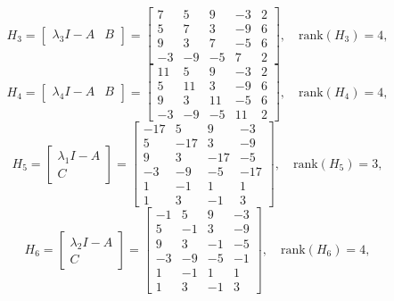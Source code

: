 \begin{equation*}
H_3 = \begin{bmatrix}
    \lambda_3 I - A & B
    \end{bmatrix} =
\begin{bmatrix}
7 & 5 & 9 & -3 & 2 \\
5 & 7 & 3 & -9 & 6 \\
9 & 3 & 7 & -5 & 6 \\
-3 & -9 & -5 & 7 & 2
\end{bmatrix},\quad
\text{rank}(H_3) = 4,
\end{equation*}
\begin{equation*}
H_4 = \begin{bmatrix}
    \lambda_4 I - A & B
    \end{bmatrix} =
\begin{bmatrix}
11 & 5 & 9 & -3 & 2 \\
5 & 11 & 3 & -9 & 6 \\
9 & 3 & 11 & -5 & 6 \\
-3 & -9 & -5 & 11 & 2
\end{bmatrix},\quad
\text{rank}(H_4) = 4,
\end{equation*}
\begin{equation*}
H_5 = \begin{bmatrix}
    \lambda_1 I - A \\ C
    \end{bmatrix} =
\begin{bmatrix}
-17 & 5 & 9 & -3 \\
5 & -17 & 3 & -9 \\
9 & 3 & -17 & -5 \\
-3 & -9 & -5 & -17 \\
1 & -1 & 1 & 1 \\
1 & 3 & -1 & 3
\end{bmatrix},\quad
\text{rank}(H_5) = 3,
\end{equation*}
\begin{equation*}
H_6 = \begin{bmatrix}
    \lambda_2 I - A \\ C
    \end{bmatrix} =
\begin{bmatrix}
-1 & 5 & 9 & -3 \\
5 & -1 & 3 & -9 \\
9 & 3 & -1 & -5 \\
-3 & -9 & -5 & -1 \\
1 & -1 & 1 & 1 \\
1 & 3 & -1 & 3
\end{bmatrix},\quad
\text{rank}(H_6) = 4,
\end{equation*}

